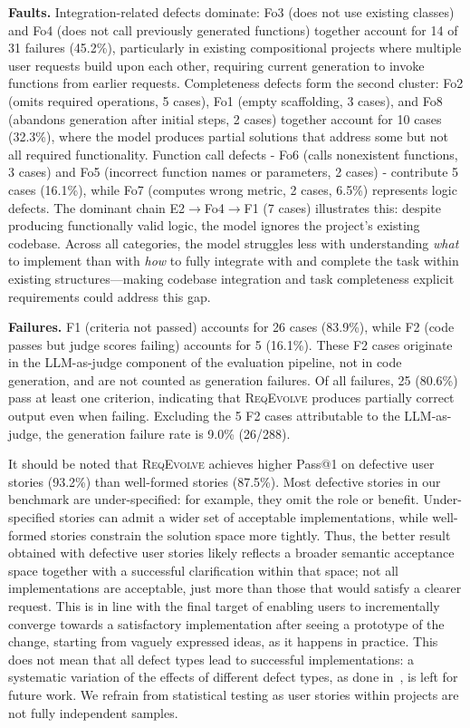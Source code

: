 \documentclass[sigconf,screen]{acmart}
\begin{document}
\textbf{Faults.} Integration-related defects dominate: Fo3 (does not use existing classes) and Fo4 (does not call previously generated functions) together account for 14 of 31 failures (45.2\%), particularly in existing compositional projects where multiple user requests build upon each other, requiring current generation to invoke functions from earlier requests. Completeness defects form the second cluster: Fo2 (omits required operations, 5 cases), Fo1 (empty scaffolding, 3 cases), and Fo8 (abandons generation after initial steps, 2 cases) together account for 10 cases (32.3\%), where the model produces partial solutions that address some but not all required functionality. Function call defects - Fo6 (calls nonexistent functions, 3 cases) and Fo5 (incorrect function names or parameters, 2 cases) - contribute 5 cases (16.1\%), while Fo7 (computes wrong metric, 2 cases, 6.5\%) represents  logic defects. The dominant chain E2$\to$Fo4$\to$F1 (7 cases) illustrates this: despite  producing functionally valid logic, the model ignores the project's existing codebase. Across all categories, the model struggles less with understanding \textit{what} to implement than with \textit{how} to fully integrate with and complete the task within existing structures---making codebase integration and task completeness explicit requirements could address this gap.

\textbf{Failures.} F1 (criteria not passed) accounts for 26 cases (83.9\%), while F2 (code passes but judge scores failing) accounts for 5 (16.1\%). These F2 cases originate in the LLM-as-judge component of the evaluation pipeline, not in code generation, and are not counted as generation failures. Of all failures, 25 (80.6\%) pass at least one criterion, indicating that \textsc{ReqEvolve} produces partially correct output even when failing.  Excluding the 5 F2 cases attributable to the LLM-as-judge, the generation failure rate is 9.0\% (26/288).

It should be noted that \textsc{ReqEvolve} achieves higher Pass@1 on defective user stories (93.2\%) than well-formed stories (87.5\%).  Most defective stories in our benchmark are under-specified: for example, they omit the role or benefit. Under-specified stories can admit a wider set of acceptable implementations, while well-formed stories constrain the solution space more tightly. Thus, the better result obtained with defective user stories likely reflects a broader semantic acceptance space together with a successful clarification within that space; not all implementations are acceptable, just more than those that would satisfy a clearer request. This is in line with the final target of enabling users to incrementally converge towards a satisfactory implementation after seeing a prototype of the change, starting from vaguely expressed ideas, as it happens in practice. This does not mean that all defect types lead to successful implementations: a systematic variation of the effects of different defect types, as done in~\cite{vogelsang2025impact}, is left for future work. We refrain from statistical testing as user stories within projects are not fully independent samples.
\end{document}
